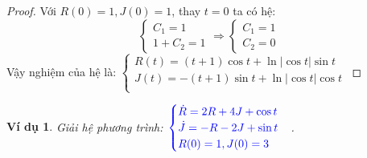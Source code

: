 \documentclass[a4paper]{article}
\newtheorem{example}{Ví dụ}
\begin{document}
\begin{proof}
Với $R(0) = 1, J(0) = 1$, thay $t = 0$ ta có hệ:
$$\begin{cases}
    C_1 = 1\\
    1 + C_2 = 1
\end{cases} \Rightarrow \begin{cases}
    C_1 = 1\\
    C_2 = 0
\end{cases}$$
Vậy nghiệm của hệ là: 
$\begin{cases}
    R(t) =  (t + 1)\cos{t} +  \ln{\vert\cos{t} \vert}\sin{t} \\
    J(t) =  -(t + 1)\sin{t} +  \ln{\vert\cos{t} \vert}\cos{t} \\
    \end{cases} $
\end{proof}

\begin{example}
    Giải hệ phương trình: $\textcolor{blue}{
    \begin{cases}
    \dot{R}= 2R + 4J + \cos{t}\\
    \dot{J}=-R - 2J  + \sin{t}\\
    R(0)=1,J(0)= 3
    \end{cases}
    }$.
\end{example}
\end{document}
